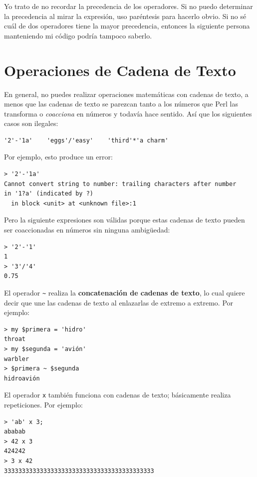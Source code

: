 Yo trato de no recordar la precedencia de los operadores. Si no puedo 
determinar la precedencia al mirar la expresión, uso paréntesis para
hacerlo obvio. Si no sé cuál de dos operadores tiene la mayor precedencia, entonces 
la siguiente persona manteniendo mi código podría tampoco saberlo.


\section{Operaciones de Cadena de Texto}
\label{string_operations}

En general, no puedes realizar operaciones matemáticas con cadenas de texto,
a menos que las cadenas de texto se parezcan tanto a los números que 
Perl las transforma o \emph{coacciona} en números y todavía hace sentido.
Así que los siguientes casos son ilegales:

\begin{verbatim}
'2'-'1a'    'eggs'/'easy'    'third'*'a charm'
\end{verbatim}
%

Por ejemplo, esto produce un error:

\begin{verbatim}
> '2'-'1a'
Cannot convert string to number: trailing characters after number 
in '1?a' (indicated by ?)
  in block <unit> at <unknown file>:1
\end{verbatim}
%

Pero la siguiente expresiones son válidas porque estas cadenas de texto
pueden ser coaccionadas en números sin ninguna ambigüedad:
\begin{verbatim}
> '2'-'1'
1
> '3'/'4'
0.75
\end{verbatim}
%

El operador \verb'~' realiza la {\bf concatenación de cadenas de texto}, 
lo cual quiere decir que une las cadenas de texto al enlazarlas de
extremo a extremo. Por ejemplo:

\begin{verbatim}
> my $primera = 'hidro'
throat
> my $segunda = 'avión'
warbler
> $primera ~ $segunda
hidroavión
\end{verbatim}
%
El operador {\tt x} también funciona con cadenas de texto; básicamente
realiza repeticiones. Por ejemplo:

\begin{verbatim}
> 'ab' x 3;
ababab
> 42 x 3
424242
> 3 x 42
333333333333333333333333333333333333333333
\end{verbatim}

